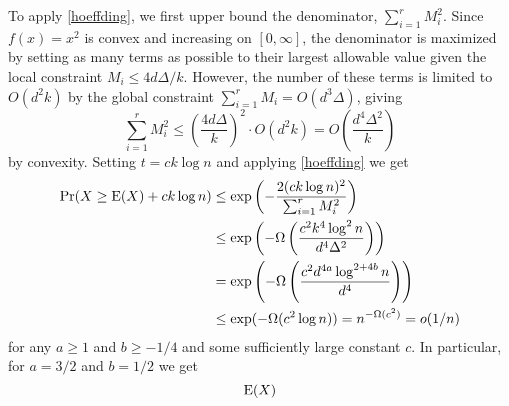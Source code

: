 \documentclass{patmorin}
\begin{document}
To apply \cref{hoeffding}, we first upper bound the denominator, $\sum_{i=1}^r M_i^2$.  Since $f(x)=x^2$ is convex and increasing on $[0,\infty]$, the denominator is maximized by setting as many terms as possible to their largest allowable value given the local constraint $M_i \le 4d\Delta/k$.  However, the number of these terms is limited to $O(d^2k)$ by the global constraint $\sum_{i=1}^r M_i= O(d^3\Delta)$, giving
\[
    \sum_{i=1}^r M_i^2 \le \left(\frac{4d\Delta}{k}\right)^2\cdot O(d^2k) = O\left(\frac{d^4\Delta^2}{k}\right)
\]
by convexity.
Setting $t=ck\log n$ and applying \cref{hoeffding} we get
\begin{align*}
  \Pr(X\ge \mathrm{E}(X) + ck\log n)
  & \le \exp\left(-\frac{2(ck\log n)^2}{\sum_{i=1}^r M_i^2}\right) \\
  & \le \exp\left(-\Omega\left(\frac{c^2k^4\log^2 n}{d^4\Delta^2}\right)\right) \\
  & = \exp\left(-\Omega\left(\frac{c^2d^{4a}\log^{2+4b} n}{d^4}\right)\right) \\
  & \le \exp(-\Omega(c^2\log n)) = n^{-\Omega(c^2)} = o(1/n)
\end{align*}
for any $a\ge 1$ and $b\ge -1/4$ and some sufficiently large constant $c$.  In particular, for $a=3/2$ and $b=1/2$ we get
\[
  \mathrm{E}(X)
\]
\end{document}
